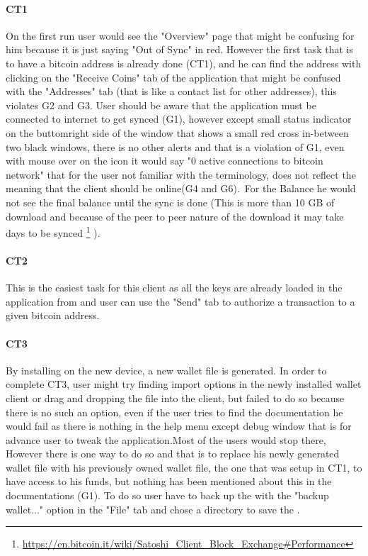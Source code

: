  \paragraph{CT1}  On the first run user would see the "Overview" page that might be confusing for him because it is just saying "Out of Sync" in red. However the first task that is to have a bitcoin address is already done (CT1), and he can find the address with clicking on the "Receive Coins" tab of the application that might be confused with the "Addresses" tab (that is like a contact list for other addresses), this violates G2 and G3.
User should be aware that the application must be connected to internet to get synced (G1), however except small status indicator on the buttomright side of the window that shows a small red cross in-between two black windows, there is no other alerts and that is a violation of G1, even with mouse over on the icon it would say "0 active connections to bitcoin network" that for the user not familiar with the terminology, does not reflect the meaning that the client should be online(G4 and G6).\ 
For the Balance he would not see the final balance until the sync is done (This is more than 10 GB of download and because of the peer to peer nature of the download it may take days to be synced \footnote {\url { https://en.bitcoin.it/wiki/Satoshi_Client_Block_Exchange\#Performance}} ).
\paragraph{CT2} This is the easiest task for this client as all the keys are already loaded in the application from \walletfile and user can use the "Send" tab to authorize a transaction to a given bitcoin address.

\paragraph{CT3} By installing \bitcoinclient on the new device, a new wallet file is generated. In order to complete CT3, user might try finding import options in the newly installed wallet client or drag and dropping the file into the client, but failed to do so because there is no such an option, even if the user tries to find the documentation he would fail as there is nothing in the help menu except debug window that is for advance user to tweak the application.Most of the users would stop there, However there is one way to do so and that is to replace his newly generated wallet file with his previously owned wallet file, the one that was setup in CT1, to have access to his funds, but nothing has been mentioned about this in the documentations (G1). To do so user have to back up the \walletfile with the "backup wallet..." option in the "File" tab and chose a directory to save the \walletfile. \

